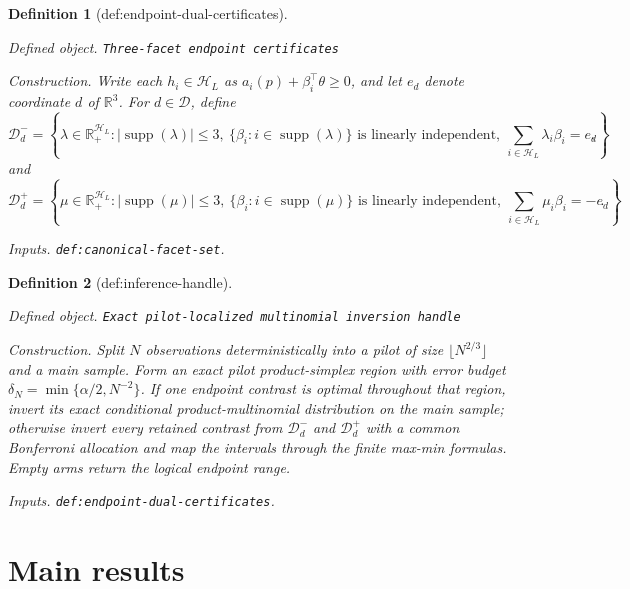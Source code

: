 \documentclass{article}
\newtheorem{definition}{Definition}
\begin{document}
\begin{definition}[def:endpoint-dual-certificates]\label{def:endpoint-dual-certificates}
\par\smallskip\noindent\emph{Defined object.} \texttt{Three-\allowbreak{}facet endpoint certificates}
\par\smallskip\noindent\emph{Construction.} Write each \(h_i\in\mathcal H_L\) as \(a_i(p)+\beta_i^\top\theta\ge0\), and let \(e_d\) denote coordinate \(d\) of \(\mathbb R^3\).  For \(d\in\mathcal D\), define
\[
 \mathcal D_d^-=
 \left\{\lambda\in\mathbb R_+^{\mathcal H_L}:
 |\operatorname{supp}(\lambda)|\le3,\ 
 \{\beta_i:i\in\operatorname{supp}(\lambda)\}\text{ is linearly independent},\ 
 \sum_{i\in\mathcal H_L}\lambda_i\beta_i=e_d\right\},
\]
and
\[
 \mathcal D_d^+=
 \left\{\mu\in\mathbb R_+^{\mathcal H_L}:
 |\operatorname{supp}(\mu)|\le3,\ 
 \{\beta_i:i\in\operatorname{supp}(\mu)\}\text{ is linearly independent},\ 
 \sum_{i\in\mathcal H_L}\mu_i\beta_i=-e_d\right\}.
\]
\par\smallskip\noindent\emph{Inputs.} \texttt{def:\allowbreak{}canonical-\allowbreak{}facet-\allowbreak{}set}.
\end{definition}

\begin{definition}[def:inference-handle]\label{def:inference-handle}
\par\smallskip\noindent\emph{Defined object.} \texttt{Exact pilot-\allowbreak{}localized multinomial inversion handle}
\par\smallskip\noindent\emph{Construction.} Split \(N\) observations deterministically into a pilot of size \(\lfloor N^{2/3}\rfloor\) and a main sample. Form an exact pilot product-simplex region with error budget \(\delta_N=\min\{\alpha/2,N^{-2}\}\). If one endpoint contrast is optimal throughout that region, invert its exact conditional product-multinomial distribution on the main sample; otherwise invert every retained contrast from \(\mathcal D_d^-\) and \(\mathcal D_d^+\) with a common Bonferroni allocation and map the intervals through the finite max-min formulas. Empty arms return the logical endpoint range.
\par\smallskip\noindent\emph{Inputs.} \texttt{def:\allowbreak{}endpoint-\allowbreak{}dual-\allowbreak{}certificates}.
\end{definition}

\section{Main results}
\end{document}
